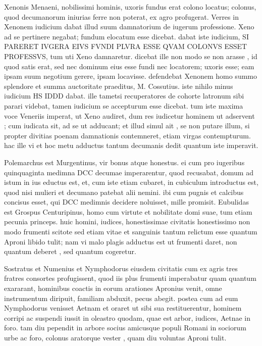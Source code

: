  Xenonis Menaeni, nobilissimi hominis, uxoris fundus erat colono locatus; colonus, quod decumanorum iniurias ferre non poterat, ex agro profugerat. Verres in Xenonem iudicium dabat illud suum damnatorium de iugerum professione. Xeno ad se pertinere negabat; fundum elocatum esse dicebat. dabat iste iudicium, SI PARERET IVGERA EIVS FVNDI PLVRA ESSE QVAM COLONVS ESSET PROFESSVS, tum uti Xeno damnaretur. dicebat ille non modo se non arasse , id quod satis erat, sed nec dominum eius esse fundi nec locatorem; uxoris esse; eam ipsam suum negotium gerere, ipsam locavisse. defendebat Xenonem homo summo splendore et summa auctoritate praeditus, M. Cossutius. iste nihilo minus iudicium HS IDDD dabat. ille tametsi recuperatores de cohorte latronum sibi parari videbat, tamen iudicium se accepturum esse dicebat. tum iste maxima voce Veneriis imperat, ut Xeno audiret, dum res iudicetur hominem ut adservent ; cum iudicata sit, ad se ut adducant; et illud simul ait , se non putare illum, si propter divitias poenam damnationis contemneret, etiam virgas contempturum. hac ille vi et hoc metu adductus tantum decumanis dedit quantum iste imperavit.

 Polemarchus est Murgentinus, vir bonus atque honestus. ei cum pro iugeribus quinquaginta medimna DCC decumae imperarentur, quod recusabat, domum ad istum in ius eductus est, et, cum iste etiam cubaret, in cubiculum introductus est, quod nisi mulieri et decumano patebat alii nemini. ibi cum pugnis et calcibus concisus esset, qui DCC medimnis decidere noluisset, mille promisit. Eubulidas est Grospus Centuripinus, homo cum virtute et nobilitate domi suae, tum etiam pecunia princeps. huic homini, iudices, honestissimae civitatis honestissimo non modo frumenti scitote sed etiam vitae et sanguinis tantum relictum esse quantum Aproni libido tulit; nam vi malo plagis adductus est ut frumenti daret, non quantum deberet , sed quantum cogeretur.

 Sostratus et Numenius et Nymphodorus eiusdem civitatis cum ex agris tres fratres consortes profugissent, quod iis plus frumenti imperabatur quam quantum exararant, hominibus coactis in eorum arationes Apronius venit, omne instrumentum diripuit, familiam abduxit, pecus abegit. postea cum ad eum Nymphodorus venisset Aetnam et oraret ut sibi sua restituerentur, hominem corripi ac suspendi iussit in oleastro quodam, quae est arbor, iudices, Aetnae in foro. tam diu pependit in arbore socius amicusque populi Romani in sociorum urbe ac foro, colonus aratorque vester , quam diu voluntas Aproni tulit.

